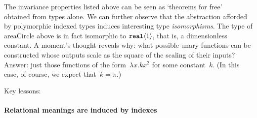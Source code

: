 The invariance properties listed above can be seen as `theorems for
free'~\cite{wadler89theorems} obtained from types alone. We can
further observe that the abstraction afforded by polymorphic indexed
types induces interesting type \emph{isomorphisms}.  The type of
$\mathrm{areaCircle}$ above is in fact isomorphic to
$\textup{\texttt{real}}\langle 1 \rangle$, that is, a dimensionless constant. A moment's
thought reveals why: what possible unary functions can be constructed whose
outputs scale as the square of the scaling of their inputs? Answer:
just those functions of the form~$\lambda x. k x^2$ for some constant~$k$.
(In this case, of course, we expect that~$k = \pi$.)






Key lessons:

\paragraph{Relational meanings are induced by indexes}

